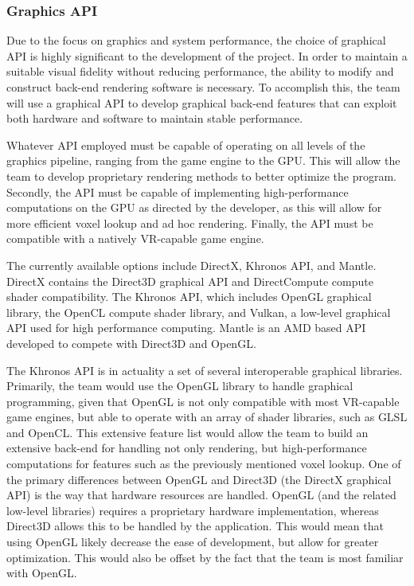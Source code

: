 \documentclass[onecolumn, draftclsnofoot,10pt, compsoc]{IEEEtran}
\newcounter{threesection}[subsubsection]
\newcounter{foursection}[threesection]
\begin{document}
\subsubsection{Graphics API}

Due to the focus on graphics and system performance, the choice of graphical API is highly significant to the development of the project. In order to maintain a suitable visual fidelity without reducing performance, the ability to modify and construct back-end rendering software is necessary. To accomplish this, the team will use a graphical API to develop graphical back-end features that can exploit both hardware and software to maintain stable performance.

Whatever API employed must be capable of operating on all levels of the graphics pipeline, ranging from the game engine to the GPU. This will allow the team to develop proprietary rendering methods to better optimize the program. Secondly, the API must be capable of implementing high-performance computations on the GPU as directed by the developer, as this will allow for more efficient voxel lookup and ad hoc rendering. Finally, the API must be compatible with a natively VR-capable game engine.

The currently available options include DirectX, Khronos API, and Mantle. DirectX contains the Direct3D graphical API and DirectCompute compute shader compatibility. The Khronos API, which includes OpenGL graphical library, the OpenCL compute shader library, and Vulkan, a low-level graphical API used for high performance computing. Mantle is an AMD based API developed to compete with Direct3D and OpenGL. 

The Khronos API is in actuality a set of several interoperable graphical libraries. Primarily, the team would use the OpenGL library to handle graphical programming, given that OpenGL is not only compatible with most VR-capable game engines, but able to operate with an array of shader libraries, such as GLSL and OpenCL. This extensive feature list would allow the team to build an extensive back-end for handling not only rendering, but high-performance computations for features such as the previously mentioned voxel lookup. One of the primary differences between OpenGL and Direct3D (the DirectX graphical API) is the way that hardware resources are handled. OpenGL (and the related low-level libraries) requires a proprietary hardware implementation, whereas Direct3D allows this to be handled by the application. This would mean that using OpenGL likely decrease the ease of development, but allow for greater optimization. This would also be offset by the fact that the team is most familiar with OpenGL.
\end{document}
